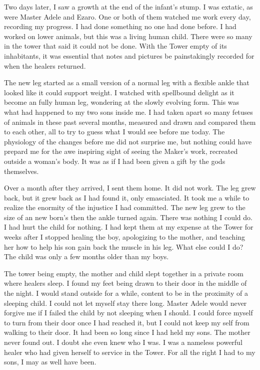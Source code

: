 \documentclass{article}
\begin{document}
Two days later, I saw a growth at the end of the infant's stump. I was extatic, as were Master Adele and Ezaro. One or both of them watched me work every day, recording my progress. I had done something no one had done before. I had worked on lower animals, but this was a living human child. There were so many in the tower that said it could not be done. With the Tower empty of its inhabitants, it was essential that notes and pictures be painstakingly recorded for when the healers returned. 

The new leg started as a small version of a normal leg with a flexible ankle that looked like it could support weight. I watched with spellbound delight as it become an fully human leg, wondering at the slowly evolving form. This was what had happened to my two sons inside me. I had taken apart so many fetuses of animals in these past several months, measured and drawn and compared them to each other, all to try to guess what I would see before me today. The physiology of the changes before me did not surprise me, but nothing could have prepard me for the awe inspiring sight of seeing the Maker's work, recreated outside a woman's body. It was as if I had been given a gift by the gods themselves.

Over a month after they arrived, I sent them home. It did not work. The leg grew back, but it grew back as I had found it, only emasciated. It took me a while to realize the enormity of the injustice I had committed. The new leg grew to the size of an new born's then the ankle turned again. There was nothing I could do. I had hurt the child for nothing. I had kept them at my expense at the Tower for weeks after I stopped healing the boy, apologizing to the mother, and teaching her how to help his son gain back the muscle in his leg. What else could I do? The child was only a few months older than my boys.

The tower being empty, the mother and child slept together in a private room where healers sleep. I found my feet being drawn to their door in the middle of the night. I would stand outside for a while, content to be in the proximity of a sleeping child. I could not let myself stay there long. Master Adele would never forgive me if I failed the child by not sleeping when I should. I could force myself to turn from their door once I had reached it, but I could not keep my self from walking to their door. It had been so long since I had held my sons. The mother never found out. I doubt she even knew who I was. I was a nameless powerful healer who had given herself to service in the Tower. For all the right I had to my sons, I may as well have been. 
\end{document}
